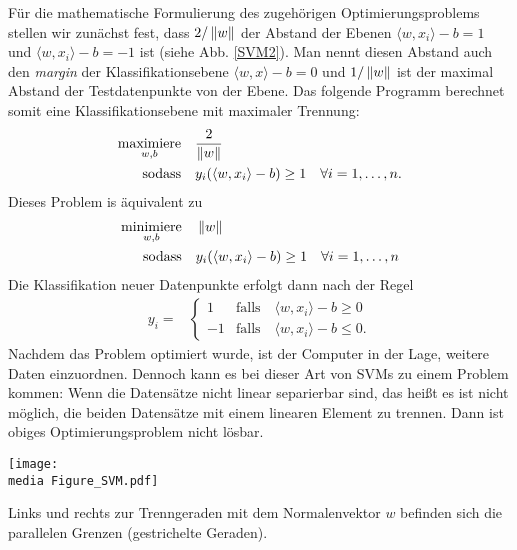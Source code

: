 Für die mathematische Formulierung des zugehörigen Optimierungsproblems stellen wir zunächst fest, dass $2/\left\lVert w\right\rVert$ der Abstand der Ebenen $\langle w, x_i\rangle - b = 1$ und $\langle w, x_i\rangle - b = -1$ ist (siehe Abb. \ref{SVM2}). Man nennt diesen Abstand auch den \emph{margin} der Klassifikationsebene $\langle w, x\rangle - b = 0$ und $1/\left\lVert w\right\rVert$ ist der maximal Abstand der Testdatenpunkte von der Ebene. Das folgende Programm berechnet somit eine Klassifikationsebene mit maximaler Trennung:
\begin{align*}
	\underset{w,b}{\operatorname{maximiere}} \quad & \frac{2}{\left\lVert w\right\rVert} \\
	\operatorname{sodass} \quad &y_{i}(\langle w,x_{i} \rangle -b) \geq 1 \quad \forall  i = 1,\dots ,n.
\end{align*}
Dieses Problem is äquivalent zu
\begin{align*}
		\underset{w,b}{\operatorname{minimiere}} \quad & \left\lVert w\right\rVert \\
		\operatorname{sodass} \quad &y_{i}(\langle w,x_{i} \rangle -b) \geq 1 \quad \forall i = 1,\dots,n
\end{align*}
Die Klassifikation neuer Datenpunkte erfolgt dann nach der Regel
\begin{align*}
	y_{i} =& 
        \begin{cases}
1 &\text{falls} \quad \langle w,x_{i} \rangle - b \geq 0 \\
-1 &\text{falls} \quad \langle w,x_{i} \rangle - b \leq 0.
\end{cases}
\end{align*}
Nachdem das Problem optimiert wurde, ist der Computer in der Lage, weitere Daten einzuordnen.
Dennoch kann es bei dieser Art von SVMs zu einem Problem kommen: Wenn die Datensätze nicht linear separierbar sind, das heißt es ist nicht möglich, die beiden Datensätze mit einem linearen Element zu trennen. Dann ist obiges Optimierungsproblem nicht lösbar.

\begin{dsafigure}
	\begin{center}
		\texttt{[image: \\media Figure\_SVM.pdf]}
		\caption{Links und rechts zur Trenngeraden mit dem Normalenvektor $w$ befinden sich die parallelen Grenzen (gestrichelte Geraden).}
		\label{SVM2}
	\end{center}
\end{dsafigure}

